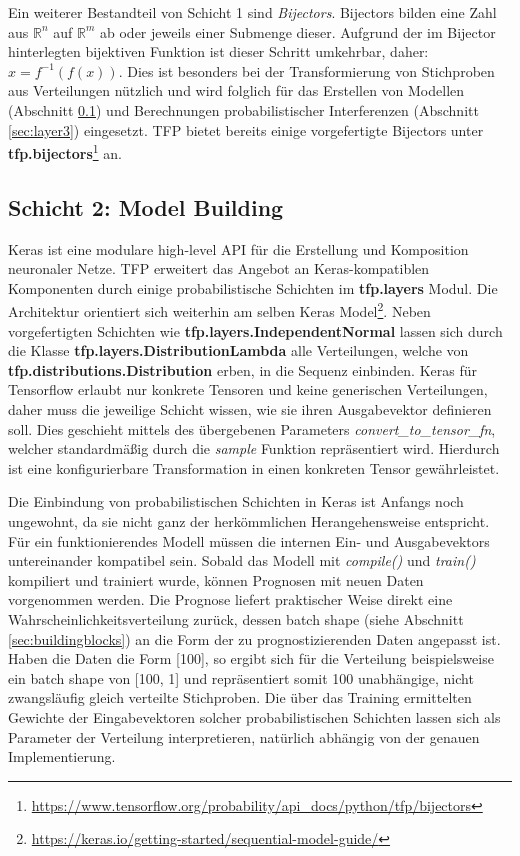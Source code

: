 \documentclass[12pt]{article}
\begin{document}
Ein weiterer Bestandteil von Schicht 1 sind \textit{Bijectors}. Bijectors bilden eine Zahl aus $\mathbb{R}^n$ auf $\mathbb{R}^m$ ab oder jeweils einer Submenge dieser. Aufgrund der im Bijector hinterlegten bijektiven Funktion ist dieser Schritt umkehrbar, daher: $x = f^{-1}(f(x))$. Dies ist besonders bei der Transformierung von Stichproben aus Verteilungen nützlich und wird folglich für das Erstellen von Modellen (Abschnitt \ref{sec:layer2}) und Berechnungen probabilistischer Interferenzen (Abschnitt \ref{sec:layer3}) eingesetzt. TFP bietet bereits einige vorgefertigte Bijectors unter \textbf{tfp.bijectors}\footnote{\url{https://www.tensorflow.org/probability/api_docs/python/tfp/bijectors}} an. 


\subsection{Schicht 2: Model Building}
\label{sec:layer2}

Keras ist eine modulare high-level API für die Erstellung und Komposition neuronaler Netze. TFP erweitert das Angebot an Keras-kompatiblen Komponenten durch einige probabilistische Schichten im \textbf{tfp.layers} Modul. Die Architektur orientiert sich weiterhin am selben Keras Model\footnote{\url{https://keras.io/getting-started/sequential-model-guide/}}. Neben vorgefertigten Schichten wie \textbf{tfp.layers.IndependentNormal} lassen sich durch die Klasse \textbf{tfp.layers.DistributionLambda} alle Verteilungen, welche von \textbf{tfp.distributions.Distribution} erben, in die Sequenz einbinden. Keras für Tensorflow erlaubt nur konkrete Tensoren und keine generischen Verteilungen, daher muss   die jeweilige Schicht wissen, wie sie ihren Ausgabevektor definieren soll. Dies geschieht mittels des übergebenen Parameters \textit{convert\_to\_tensor\_fn}, welcher standardmäßig durch die \textit{sample} Funktion repräsentiert wird. Hierdurch ist eine konfigurierbare Transformation in einen konkreten Tensor gewährleistet.

Die Einbindung von probabilistischen Schichten in Keras ist Anfangs noch ungewohnt, da sie nicht ganz der herkömmlichen Herangehensweise entspricht. Für ein funktionierendes Modell müssen die internen Ein- und Ausgabevektors untereinander kompatibel sein. Sobald das Modell mit \textit{compile()} und \textit{train()} kompiliert und trainiert wurde, können Prognosen mit neuen Daten vorgenommen werden. Die Prognose liefert praktischer Weise direkt eine Wahrscheinlichkeitsverteilung zurück, dessen batch shape (siehe Abschnitt \ref{sec:buildingblocks}) an die Form der zu prognostizierenden Daten angepasst ist. Haben die Daten die Form [100], so ergibt sich für die Verteilung beispielsweise ein batch shape von [100, 1] und repräsentiert somit 100 unabhängige, nicht zwangsläufig gleich verteilte Stichproben. Die über das Training ermittelten Gewichte der Eingabevektoren solcher probabilistischen Schichten lassen sich als Parameter der Verteilung interpretieren, natürlich abhängig von der genauen Implementierung.
\end{document}
